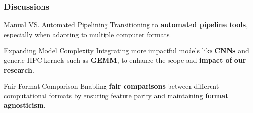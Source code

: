 \begin{frame}
    \frametitle{Discussions}

    \begin{block}{Manual VS. Automated Pipelining}
	    Transitioning to \textbf{automated pipeline tools}, especially when adapting to multiple computer formats.
    \end{block}

    \begin{block}{Expanding Model Complexity}
	    Integrating more impactful models like \textbf{CNNs} and generic HPC kernels such as \textbf{GEMM}, to enhance the scope and \textbf{impact of our research}.
    \end{block}

    \begin{block}{Fair Format Comparison}
	    Enabling \textbf{fair comparisons} between different computational formats by ensuring feature parity and maintaining \textbf{format agnosticism}.
    \end{block}


\end{frame}
